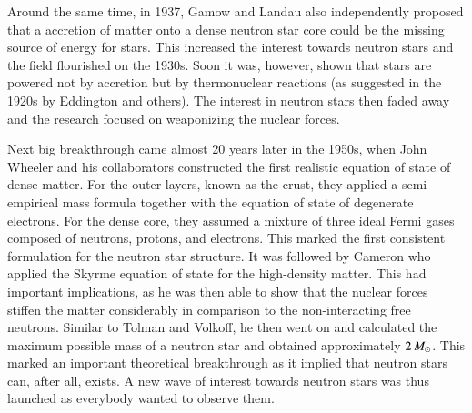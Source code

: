 Around the same time, in 1937, Gamow and Landau also independently proposed that a accretion of matter onto a dense neutron star core could be the missing source of energy for stars.
This increased the interest towards neutron stars and the field flourished on the 1930s.
Soon it was, however, shown that stars are powered not by accretion but by thermonuclear reactions (as suggested in the 1920s by Eddington and others).
The interest in neutron stars then faded away and the research focused on weaponizing the nuclear forces.



Next big breakthrough came almost 20 years later in the 1950s, when John Wheeler and his collaborators constructed the first realistic equation of state of dense matter\cite{Wheeler66}.
For the outer layers, known as the crust, they applied a semi-empirical mass formula together with the equation of state of degenerate electrons.
For the dense core, they assumed a mixture of three ideal Fermi gases composed of neutrons, protons, and electrons.
This marked the first consistent formulation for the neutron star structure.
It was followed by Cameron who applied the Skyrme equation of state for the high-density matter.\cite{Cameron59}
This had important implications, as he was then able to show that the nuclear forces stiffen the matter considerably in comparison to the non-interacting free neutrons.
Similar to Tolman and Volkoff, he then went on and calculated the maximum possible mass of a neutron star and obtained approximately $2\, M_{\odot}$.
This marked an important theoretical breakthrough as it implied that neutron stars can, after all, exists.
A new wave of interest towards neutron stars was thus launched as everybody wanted to observe them.


